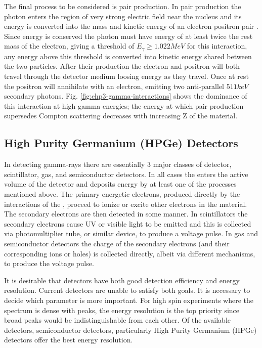 The final process to be considered is pair production. In pair production the photon enters the region of very strong electric field near the nucleus and its energy is converted into the mass and kinetic energy of an electron positron pair \cite{anderson-PhysRev.43.491,oppenheimer_PhysRev.44.53.2}. Since energy is conserved the photon must have energy of at least twice the rest mass of the electron, giving a threshold of $E_{\gamma}\geq1.022MeV$ for this interaction, any energy above this threshold is converted into kinetic energy shared between the two particles. After their production the electron and positron will both travel through the detector medium loosing energy as they travel. Once at rest the positron will annihilate with an electron, emitting two anti-parallel $511keV$ secondary photons. Fig. \ref{fig:chp3-gamma-interactions} shows the dominance of this interaction at high gamma energies; the energy at which pair production supersedes Compton scattering decreases with increasing Z of the material.

\subsection{High Purity Germanium (HPGe) Detectors}
\label{ssec:exp-pr-gamma-spec-hpge}
In detecting gamma-rays there are essentially 3 major classes of detector, scintillator, gas, and semiconductor detectors. In all cases the \gr{} enters the active volume of the detector and deposits energy by at least one of the processes mentioned above. The primary energetic electrons, produced directly by the interactions of the \gr{}, proceed to ionize or excite other electrons in the material. The secondary electrons are then detected in some manner. In scintillators the secondary electrons cause UV or visible light to be emitted and this is collected via photomultiplier tube, or similar device, to produce a voltage pulse. In gas and semiconductor detectors the charge of the secondary electrons (and their corresponding ions or holes) is collected directly, albeit via different mechanisms, to produce the voltage pulse.

It is desirable that \gr{} detectors have both good detection efficiency and energy resolution. Current \gr{} detectors are unable to satisfy both goals. It is necessary to decide which parameter is more important. For high spin experiments where the spectrum is dense with peaks, the energy resolution is the top priority since broad peaks would be indistinguishable from each other. Of the available detectors, semiconductor detectors, particularly High Purity Germanium (HPGe) detectors offer the best energy resolution.

